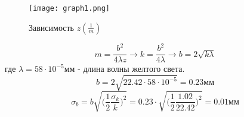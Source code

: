 \documentclass[a4paper,12pt]{article}
\begin{document}
\begin{enumerate}
    \begin{figure}[h]
    \begin{center}
        \texttt{[image: graph1.png]}
    \end{center}
    \caption{Зависимость $z(\frac{1}{m})$}
    \label{graph1}
    \end{figure}

    $$
    m = \frac{b^2}{4\lambda z} \rightarrow{k=\frac{b^2}{4\lambda}}\rightarrow b = 2\sqrt{k\lambda}
    $$
    где $\lambda=58\cdot10^{-5}\text{мм}$ - длина волны желтого света.
    $$
    b = 2\sqrt{22.42\cdot58\cdot10^{-5}} = 0.23\text{мм}
    $$
    $$
    \sigma_b = b\sqrt{\Big(\frac{1}{2}\frac{\sigma_k}{k}\Big)^2}=0.23\cdot\sqrt{\Big(\frac{1}{2}\frac{1.02}{22.42}\Big)^2} = 0.01\text{мм}
    $$

    \begin{center}
    \end{center}
    
\end{enumerate}
\end{document}
